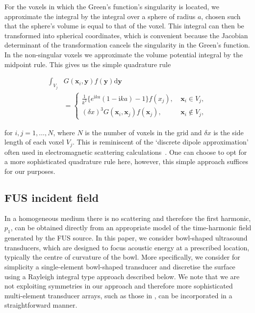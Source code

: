 \documentclass[11pt]{article}
\numberwithin{equation}{section}
\newcommand{\sd}{\mbox{d}}
\newcommand{\bx}{\mathbf{x}}
\newcommand{\by}{\mathbf{y}}
\newcommand{\red}[1]{{\color{black} #1}}
\begin{document}
For the voxels in which the Green's function's singularity is located, we 
approximate the integral by the integral over a sphere of radius $a$, chosen
such that the sphere's volume is equal to that of 
the voxel. \red{This integral can then be transformed into spherical coordinates, 
which is convenient because the Jacobian determinant of the transformation cancels
the singularity in the Green's function.}
In the non-singular voxels we 
approximate the volume potential integral by the midpoint rule. This gives us 
the simple quadrature rule
\begin{linenomath}
\begin{align}
    \nonumber\int_{V_j}&G(\bx_i,\by)f(\by)\sd \by \\ 
    &=\begin{cases}
        \frac{1}{k^2}\{e^{\text{i}ka}(1-\text{i}ka) - 1\}f(x_j), \ &\bx_i\in V_j, \\
        (\delta x)^3 G(\bx_i, \bx_j)f(\bx_j),\ &\bx_i\notin V_j,
    \end{cases}
    \label{eqn:quad}
\end{align}
\end{linenomath}
for $i,j=1,\ldots,N$, where $N$ is the number of voxels in the grid and $\delta x$
is the side length of each voxel $V_j$.
This is reminiscent of the `discrete dipole approximation' often used in 
electromagnetic scattering calculations~\cite{draine1994discrete}.
One can choose to opt for a more sophisticated quadrature rule here, however, 
this simple approach suffices for our purposes.

\subsection{\red{FUS} incident field}
\label{subsec:incident}
In a homogeneous medium there is no scattering and therefore the first harmonic,
$p_1$, can be obtained directly from an appropriate model of the time-harmonic 
field generated by the \red{FUS} source. In this paper, we consider bowl-shaped
ultrasound transducers, which are designed to focus acoustic energy at a prescribed
location, typically the centre of curvature of the bowl. 
More specifically, we consider for simplicity a single-element bowl-shaped transducer
and discretise the surface using a Rayleigh integral type approach described below.
We note that we are not exploiting symmetries in 
our approach and therefore more sophisticated multi-element transducer arrays, 
such as those in \cite{gelat2011modelling,gavrilov2000theoretical,kreider2013characterization},
can be incorporated in a straightforward manner. 
\end{document}
